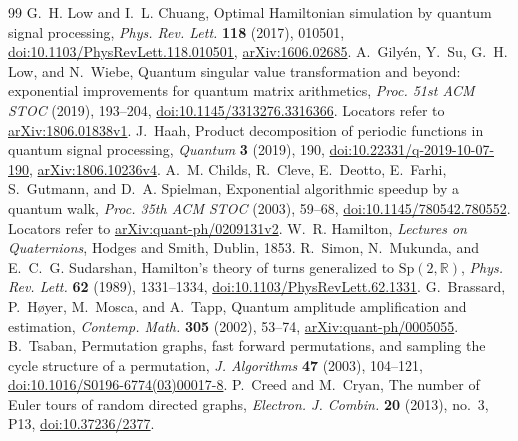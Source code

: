 \documentclass[11pt,reqno]{amsart}
\theoremstyle{definition}
\theoremstyle{remark}
\numberwithin{equation}{section}
\newcommand{\R}{\mathbb{R}}
\begin{document}
\begin{thebibliography}{99}
 G.~H. Low and I.~L. Chuang, Optimal Hamiltonian simulation by quantum signal processing, \emph{Phys. Rev. Lett.} \textbf{118} (2017), 010501, \href{https://doi.org/10.1103/PhysRevLett.118.010501}{doi:10.1103/PhysRevLett.118.010501}, \href{https://arxiv.org/abs/1606.02685}{arXiv:1606.02685}.
 A.~Gily\'en, Y.~Su, G.~H. Low, and N.~Wiebe, Quantum singular value transformation and beyond: exponential improvements for quantum matrix arithmetics, \emph{Proc. 51st ACM STOC} (2019), 193--204, \href{https://doi.org/10.1145/3313276.3316366}{doi:10.1145/3313276.3316366}. Locators refer to \href{https://arxiv.org/abs/1806.01838v1}{arXiv:1806.01838v1}.
 J.~Haah, Product decomposition of periodic functions in quantum signal processing, \emph{Quantum} \textbf{3} (2019), 190, \href{https://doi.org/10.22331/q-2019-10-07-190}{doi:10.22331/q-2019-10-07-190}, \href{https://arxiv.org/abs/1806.10236v4}{arXiv:1806.10236v4}.
 A.~M. Childs, R.~Cleve, E.~Deotto, E.~Farhi, S.~Gutmann, and D.~A. Spielman, Exponential algorithmic speedup by a quantum walk, \emph{Proc. 35th ACM STOC} (2003), 59--68, \href{https://doi.org/10.1145/780542.780552}{doi:10.1145/780542.780552}. Locators refer to \href{https://arxiv.org/abs/quant-ph/0209131v2}{arXiv:quant-ph/0209131v2}.
 W.~R. Hamilton, \emph{Lectures on Quaternions}, Hodges and Smith, Dublin, 1853.
 R.~Simon, N.~Mukunda, and E.~C.~G. Sudarshan, Hamilton's theory of turns generalized to $\mathrm{Sp}(2,\R)$, \emph{Phys. Rev. Lett.} \textbf{62} (1989), 1331--1334, \href{https://doi.org/10.1103/PhysRevLett.62.1331}{doi:10.1103/PhysRevLett.62.1331}.
 G.~Brassard, P.~H{\o}yer, M.~Mosca, and A.~Tapp, Quantum amplitude amplification and estimation, \emph{Contemp. Math.} \textbf{305} (2002), 53--74, \href{https://arxiv.org/abs/quant-ph/0005055}{arXiv:quant-ph/0005055}.
 B.~Tsaban, Permutation graphs, fast forward permutations, and sampling the cycle structure of a permutation, \emph{J. Algorithms} \textbf{47} (2003), 104--121, \href{https://doi.org/10.1016/S0196-6774(03)00017-8}{doi:10.1016/S0196-6774(03)00017-8}.
 P.~Creed and M.~Cryan, The number of Euler tours of random directed graphs, \emph{Electron. J. Combin.} \textbf{20} (2013), no.~3, P13, \href{https://doi.org/10.37236/2377}{doi:10.37236/2377}.

\end{thebibliography}
\end{document}
